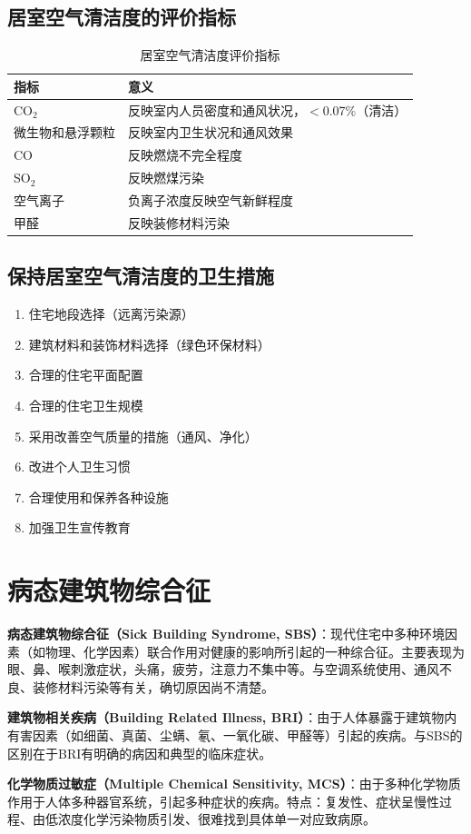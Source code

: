 \documentclass[10pt,a4paper,oneside]{ctexbook}
\begin{document}
\subsection{居室空气清洁度的评价指标}

\begin{table}[htbp]
\centering
\caption{居室空气清洁度评价指标}
\begin{tabularx}{\textwidth}{lX}
\hline
\textbf{指标} & \textbf{意义} \\
\hline
CO$_2$ & 反映室内人员密度和通风状况，$<$0.07\%（清洁） \\
微生物和悬浮颗粒 & 反映室内卫生状况和通风效果 \\
CO & 反映燃烧不完全程度 \\
SO$_2$ & 反映燃煤污染 \\
空气离子 & 负离子浓度反映空气新鲜程度 \\
甲醛 & 反映装修材料污染 \\
\hline
\end{tabularx}
\end{table}

\subsection{保持居室空气清洁度的卫生措施}

\begin{enumerate}[leftmargin=*]
    \item 住宅地段选择（远离污染源）
    \item 建筑材料和装饰材料选择（绿色环保材料）
    \item 合理的住宅平面配置
    \item 合理的住宅卫生规模
    \item 采用改善空气质量的措施（通风、净化）
    \item 改进个人卫生习惯
    \item 合理使用和保养各种设施
    \item 加强卫生宣传教育
\end{enumerate}

\section{病态建筑物综合征}

\begin{defbox}
\textbf{病态建筑物综合征（Sick Building Syndrome, SBS）}：现代住宅中多种环境因素（如物理、化学因素）联合作用对健康的影响所引起的一种综合征。主要表现为眼、鼻、喉刺激症状，头痛，疲劳，注意力不集中等。与空调系统使用、通风不良、装修材料污染等有关，确切原因尚不清楚。

\textbf{建筑物相关疾病（Building Related Illness, BRI）}：由于人体暴露于建筑物内有害因素（如细菌、真菌、尘螨、氡、一氧化碳、甲醛等）引起的疾病。与SBS的区别在于BRI有明确的病因和典型的临床症状。

\textbf{化学物质过敏症（Multiple Chemical Sensitivity, MCS）}：由于多种化学物质作用于人体多种器官系统，引起多种症状的疾病。特点：复发性、症状呈慢性过程、由低浓度化学污染物质引发、很难找到具体单一对应致病原。
\end{defbox}
\end{document}
